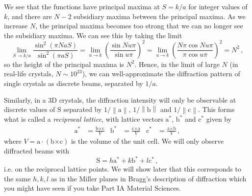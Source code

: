 \documentclass{article}
\theoremstyle{plain}\theoremheaderfont{\normalfont\itshape}\theorembodyfont{\rmfamily}\theoremseparator{.}\newtheorem*{rem}{Remark}\newtheorem*{ex}{Example}\newtheorem*{proof}{Proof}\newtheorem*{altp}{Alternative proof}
\theoremstyle{plain}\theoremheaderfont{\normalfont\bfseries}\theorembodyfont{\rmfamily}\theoremseparator{.}\newtheorem{thm}{Theorem}[section]\newtheorem{lem}[thm]{Lemma}\newtheorem{prop}[thm]{Proposition}\newtheorem*{cor}{Corollary}\newtheorem{defn}[thm]{Definition}\newtheorem{clm}[thm]{Claim}\newtheorem{clminproof}{Claim}\newtheorem*{law}{Law}\newtheorem{pos}[thm]{Postulate}
\theoremstyle{break}\theoremheaderfont{\normalfont\itshape}\theorembodyfont{\rmfamily}\theoremseparator{.\medskip}\newtheorem*{proofskip}{Proof}\newtheorem*{exs}{Examples}\newtheorem*{rems}{Remarks}
\theoremstyle{break}\theoremheaderfont{\normalfont\bfseries}\theorembodyfont{\rmfamily}\theoremseparator{.\medskip}\newtheorem{lemskip}[thm]{Lemma}\newtheorem{defnskip}[thm]{Definition}\newtheorem{propskip}[thm]{Proposition}\newtheorem{thmskip}[thm]{Theorem}
\numberwithin{equation}{section}
\newcommand{\vb}[1]{\bm{\mathrm{#1}}}
\newcommand{\vdot}{\,\bm{\mathrm{\cdot}}\,}
\newcommand{\cross}{\bm{\times}}
\newcommand{\norm}[1]{\left\| #1 \right\|}
\begin{document}
    We see that the functions have principal maxima at \(S=k/a\) for integer values of \(k\), and there are \(N-2\) subsidiary maxima between the principal maxima. As we increase \(N\), the principal maxima becomes too strong that we can no longer see the subsidiary maxima. We can see this by taking the limit
    \begin{equation}
        \lim_{S\to k/a}\frac{\sin^2(\pi NaS)}{\sin^2(\pi aS)}=\lim_{u\to k}\left(\frac{\sin Nu\pi}{\sin u\pi}\right)^2=\lim_{u\to k}\left(\frac{N\pi\cos Nu\pi}{\pi\cos u\pi}\right)^2=N^2\,,
    \end{equation}
    so the height of the principal maxima is \(N^2\). Hence, in the limit of large \(N\) (in real-life crystals, \(N\sim 10^{23}\)), we can well-approximate the diffraction pattern of single crystals as discrete beams, separated by \(1/a\).

    Similarly, in a 3D crystals, the diffraction intensity will only be observable at discrete values of \(\vb{S}\) separated by \(1/\norm{\vb{a}}\), \(1/\norm{\vb{b}}\) and \(1/\norm{\vb{c}}\). This forms what is called a \textit{reciprocal lattice}, with lattice vectors \(\vb{a}^*\), \(\vb{b}^*\) and \(\vb{c}^*\) given by
    \begin{align}
        \vb{a}^*&=\frac{\vb{b}\cross\vb{c}}{V} & \vb{b}^*&=\frac{\vb{c}\cross\vb{a}}{V} & \vb{c}^*&=\frac{\vb{a}\cross\vb{b}}{V}\,,
    \end{align}
    where \(V=\vb{a}\vdot(\vb{b}\cross\vb{c})\) is the volume of the unit cell. We will only observe diffracted beams with
    \begin{equation}
        \vb{S}=h\vb{a}^*+k\vb{b}^*+l\vb{c}^*\,,
    \end{equation}
    i.e. on the reciprocal lattice points. We will show later that this corresponds to the same \(h,k,l\) as in the Miller planes in Bragg's description of diffraction which you might have seen if you take Part IA Material Sciences.
\end{document}
